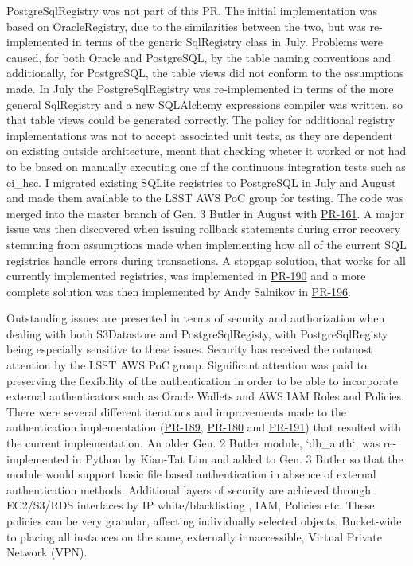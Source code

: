 PostgreSqlRegistry was not part of this PR. The initial implementation was based on OracleRegistry, due to the similarities between the two, but was re-implemented in terms of the generic SqlRegistry class in July. Problems were caused, for both Oracle and PostgreSQL, by the table naming conventions and additionally, for PostgreSQL, the table views did not conform to the assumptions made. In July the PostgreSqlRegistry was re-implemented in terms of the more general SqlRegistry and a new SQLAlchemy expressions compiler was written, so that table views could be generated correctly. The policy for additional registry implementations was not to accept associated unit tests, as they are dependent on existing outside architecture, meant that checking wheter it worked or not had to be based on manually executing one of the continuous integration tests such as ci\_hsc. I migrated existing SQLite registries to PostgreSQL in July and August and made them available to the LSST AWS PoC group for testing. The code was merged into the master branch of Gen. 3 Butler in August with \href{https://github.com/lsst/daf_butler/pull/161}{PR-161}. A major issue was then discovered when issuing rollback statements during error recovery stemming from assumptions made when implementing how all of the current SQL registries handle errors during transactions. A stopgap solution, that works for all currently implemented registries, was implemented in \href{https://github.com/lsst/daf_butler/pull/190}{PR-190} and a more complete solution was then implemented by Andy Salnikov in \href{https://github.com/lsst/daf_butler/pull/196}{PR-196}.

Outstanding issues are presented in terms of security and authorization when dealing with both S3Datastore and PostgreSqlRegisty, with PostgreSqlRegisty being especially sensitive to these issues. Security has received the outmost attention by the LSST AWS PoC group. Significant attention was paid to preserving the flexibility of the authentication in order to be able to incorporate external authenticators such as Oracle Wallets and AWS IAM Roles and Policies. There were several different iterations and improvements made to the authentication implementation (\href{https://github.com/lsst/daf_butler/pull/189}{PR-189}, \href{https://github.com/lsst/daf_butler/pull/180}{PR-180} and \href{https://github.com/lsst/daf_butler/pull/191}{PR-191}) that resulted with the current implementation. An older Gen. 2 Butler module, `db\_auth`, was re-implemented in Python by Kian-Tat Lim and added to Gen. 3 Butler so that the module would support basic file based authentication in absence of external authentication methods. Additional layers of security are achieved through EC2/S3/RDS interfaces by IP white/blacklisting , IAM, Policies etc. These policies can be very granular, affecting individually selected objects, Bucket-wide to placing all instances on the same, externally innaccessible, Virtual Private Network (VPN).


